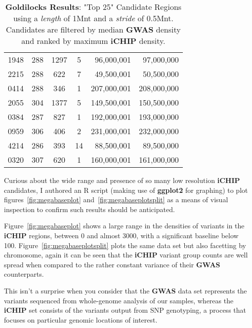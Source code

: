 \begin{table}[H]
\begin{tabular}{l | c  c  c  r  r}
        1948&288&1297&5&  96,000,001 &   97,000,000\\
        2215&288&622&7&  49,500,001 &   50,500,000\\
        0414&288&346&1& 207,000,001&  208,000,000\\
        2055&304&1377&5& 149,500,001 &  150,500,000\\
        0384&287&827&1& 192,000,001 &  193,000,000\\
        0959&306&406&2& 231,000,001 &  232,000,000\\
        4214&286&393&14&  88,500,001 &   89,500,000\\
        0320&307&620&1& 160,000,001 &  161,000,000\\
    \end{tabular}

    \caption[resultsp2]{\textbf{Goldilocks Results}: "Top 25" Candidate Regions
    using a \textit{length} of 1Mnt and a \textit{stride} of 0.5Mnt. Candidates
    are filtered by median \textbf{GWAS} density and ranked by maximum
    \textbf{iCHIP} density.}
    \label{tab:resultsp2}
\end{table}

Curious about the wide range and presence of so many low resolution
\textbf{iCHIP} candidates, I authored an R script (making use of
\textbf{ggplot2}\citep{ggplot2} for graphing) to plot
figures~\ref{fig:megabaseplot} and~\ref{fig:megabaseplotsplit} as a means of
visual inspection to confirm such results should be anticipated.

Figure~\ref{fig:megabaseplot} shows a large range in the densities of
variants in the \textbf{iCHIP} regions, between 0 and almost 3000, with a
significant baseline below 100. Figure~\ref{fig:megabaseplotsplit} plots the
same data set but also facetting by chromosome, again it can be seen that the
\textbf{iCHIP} variant group counts are well spread when compared to the rather
constant variance of their \textbf{GWAS} counterparts.

This isn't a surprise when you consider that the \textbf{GWAS} data set
represents the variants sequenced from whole-genome analysis of our samples,
whereas the \textbf{iCHIP} set consists of the variants output from SNP
genotyping, a process that focuses on particular genomic locations of interest.


